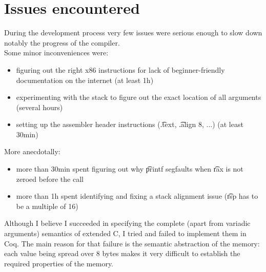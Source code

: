 \section{Issues encountered}

During the development process very few issues were serious enough to slow down notably the progress of the compiler.\\
Some minor inconveniences were:\vspace{-0.8em}
\begin{itemize}
    \item figuring out the right x86 instructions for lack of beginner-friendly documentation on the internet (at least 1h)
    \item experimenting with the stack to figure out the exact location of all arguments (several hours)
    \item setting up the assembler header instructions (\t{.text}, \t{.align 8}, ...) (at least 30min)
\end{itemize}

More anecdotally:\vspace{-0.8em}
\begin{itemize}
    \item more than 30min spent figuring out why \t{printf} segfaults when \t{rax} is not zeroed before the call
    \item more than 1h spent identifying and fixing a stack alignment issue (\t{rsp} has to be a multiple of 16)
\end{itemize}

Although I believe I succeeded in specifying the complete (apart from variadic arguments) semantics of extended C\textminus\textminus, I tried and failed to implement them in Coq. The main reason for that failure is the semantic abstraction of the memory: each value being spread over 8 bytes makes it very difficult to establish the required properties of the memory.
